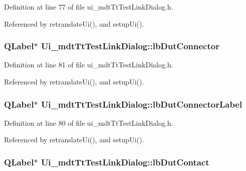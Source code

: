 Definition at line 77 of file ui\-\_\-mdt\-Tt\-Test\-Link\-Dialog.\-h.



Referenced by retranslate\-Ui(), and setup\-Ui().

\hypertarget{class_ui__mdt_tt_test_link_dialog_a8485811fea577b5f6b4d510d91df7981}{
\subsubsection[{lb\-Dut\-Connector}]{\setlength{\rightskip}{0pt plus 5cm}Q\-Label$\ast$ Ui\-\_\-mdt\-Tt\-Test\-Link\-Dialog\-::lb\-Dut\-Connector}}\label{class_ui__mdt_tt_test_link_dialog_a8485811fea577b5f6b4d510d91df7981}


Definition at line 81 of file ui\-\_\-mdt\-Tt\-Test\-Link\-Dialog.\-h.



Referenced by retranslate\-Ui(), and setup\-Ui().

\hypertarget{class_ui__mdt_tt_test_link_dialog_a1ca56e4a3af35812a35cfdd56f18ca14}{
\subsubsection[{lb\-Dut\-Connector\-Label}]{\setlength{\rightskip}{0pt plus 5cm}Q\-Label$\ast$ Ui\-\_\-mdt\-Tt\-Test\-Link\-Dialog\-::lb\-Dut\-Connector\-Label}}\label{class_ui__mdt_tt_test_link_dialog_a1ca56e4a3af35812a35cfdd56f18ca14}


Definition at line 80 of file ui\-\_\-mdt\-Tt\-Test\-Link\-Dialog.\-h.



Referenced by retranslate\-Ui(), and setup\-Ui().

\hypertarget{class_ui__mdt_tt_test_link_dialog_a5b492e12ab8401cf808ee93cc815a534}{
\subsubsection[{lb\-Dut\-Contact}]{\setlength{\rightskip}{0pt plus 5cm}Q\-Label$\ast$ Ui\-\_\-mdt\-Tt\-Test\-Link\-Dialog\-::lb\-Dut\-Contact}}\label{class_ui__mdt_tt_test_link_dialog_a5b492e12ab8401cf808ee93cc815a534}


